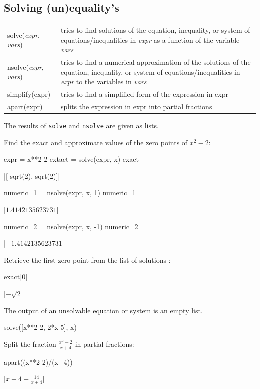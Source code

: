 \subsection{Solving (un)equality's}
\begin{tabular}{>{\hfill}p{5cm}p{12cm}}
	solve(\textit{expr}, \textit{vars})		&	tries to find solutions of the equation, inequality, or system of equations/inequalities in \textit{expr} as a function of the variable \textit{vars}\\
	nsolve(\textit{expr}, \textit{vars})		&	tries to find a numerical approximation of the solutions of the equation, inequality, or system of equations/inequalities in \textit{expr} to the variables in \textit{vars}\\
	simplify(expr)			&	tries to find a simplified form of the expression in expr\\
	apart(expr)			&	splits the expression in expr into partial fractions\\
\end{tabular}

The results of \lstinline|solve| and \lstinline|nsolve| are given as lists.

\begin{example}
Find the exact and approximate values of the zero points of $x^2-2$:
\begin{pyin}
    expr = x**2-2
    extact = solve(expr, x)
    exact
\end{pyin}
\begin{pyout}
     |[-sqrt(2), sqrt(2)]|
\end{pyout}

\begin{pyin}
    numeric_1 = nsolve(expr, x, 1)
    numeric_1
\end{pyin}
\begin{pyout}
    |$1.4142135623731$|
\end{pyout}
\begin{pyin}
    numeric_2 = nsolve(expr, x, -1)
    numeric_2
\end{pyin}
\begin{pyout}
    |$-1.4142135623731$|
\end{pyout}
	Retrieve the first zero point from the list of solutions :
\begin{pyin}
    exact[0]
\end{pyin}
\begin{pyout}
    |$-\sqrt{2}$|
\end{pyout}
	The output of an unsolvable equation or system is an empty list.

\begin{pyin}
    solve([x**2-2, 2*x-5], x)
\end{pyin}
\begin{pyout}
    []
\end{pyout}
Split the fraction $\frac{x^2-2}{x+4}$ in partial fractions:

\begin{pyin}
    apart((x**2-2)/(x+4))
\end{pyin}
\begin{pyout}
    |$x-4+\frac{14}{x+4}$|
\end{pyout}
\end{example}

